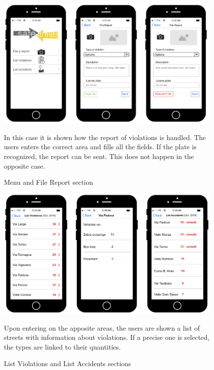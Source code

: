 \begin{figure} [H]
\includegraphics[scale=0.47]{Images/Templates/User/us_3.PNG}
\caption{\label{fig:Mockup-2}Menu and File Report section}
In this case it is shown how the report of violations is handled. The users enters the correct area and fills all the fields. If the plate is recognized, the report can be sent. This does not happen in the opposite case.
\end{figure}


\begin{figure}[t]
\includegraphics[scale=0.5]{Images/Templates/User/us_4.PNG}
\caption{\label{fig:Mockup-3}List Violations and List Accidents sections}
Upon entering on the apposite areas, the users are shown a list of streets with information about violations. If a precise one is selected, the types are linked to their quantities.
\end{figure}


